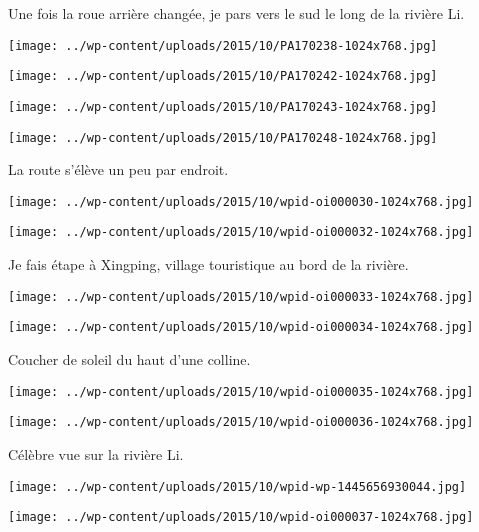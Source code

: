  Une fois la roue arrière changée, je pars vers le sud le long de la rivière Li. 
\begin{center} \texttt{[image: ../wp-content/uploads/2015/10/PA170238-1024x768.jpg]} \end{center}
\begin{center} \texttt{[image: ../wp-content/uploads/2015/10/PA170242-1024x768.jpg]} \end{center}
\begin{center} \texttt{[image: ../wp-content/uploads/2015/10/PA170243-1024x768.jpg]} \end{center}
\begin{center} \texttt{[image: ../wp-content/uploads/2015/10/PA170248-1024x768.jpg]} \end{center}

  La route s'élève un peu par endroit.
\begin{center} \texttt{[image: ../wp-content/uploads/2015/10/wpid-oi000030-1024x768.jpg]} \end{center}
\begin{center} \texttt{[image: ../wp-content/uploads/2015/10/wpid-oi000032-1024x768.jpg]} \end{center}

 Je fais étape à Xingping, village touristique au bord de la rivière. 
\begin{center} \texttt{[image: ../wp-content/uploads/2015/10/wpid-oi000033-1024x768.jpg]} \end{center}
\begin{center} \texttt{[image: ../wp-content/uploads/2015/10/wpid-oi000034-1024x768.jpg]} \end{center}

 Coucher de soleil du haut d'une colline. 
\begin{center} \texttt{[image: ../wp-content/uploads/2015/10/wpid-oi000035-1024x768.jpg]} \end{center}
\begin{center} \texttt{[image: ../wp-content/uploads/2015/10/wpid-oi000036-1024x768.jpg]} \end{center}

 Célèbre vue sur la rivière Li. 
\begin{center} \texttt{[image: ../wp-content/uploads/2015/10/wpid-wp-1445656930044.jpg]} \end{center}
\begin{center} \texttt{[image: ../wp-content/uploads/2015/10/wpid-oi000037-1024x768.jpg]} \end{center}

